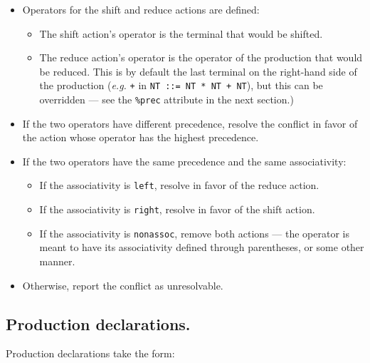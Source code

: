 \documentclass[12pt,english,twoside]{report}
\begin{document}
\begin{itemize}
\item Operators for the shift and reduce actions are defined:

\begin{itemize}
\item The shift action's operator is the terminal that would be shifted.
\item The reduce action's operator is the operator of the production that
would be reduced. This is by default the last terminal on the right-hand
side of the production (\emph{e.g.} \texttt{+} in \texttt{NT ::= NT
{*} NT + NT}), but this can be overridden --- see the \texttt{\%prec}
attribute in the next section.)
\end{itemize}
\item If the two operators have different precedence, resolve the conflict
in favor of the action whose operator has the highest precedence.
\item If the two operators have the same precedence and the same associativity:

\begin{itemize}
\item If the associativity is \texttt{left}, resolve in favor of the reduce
action.
\item If the associativity is \texttt{right}, resolve in favor of the shift
action.
\item If the associativity is \texttt{nonassoc}, remove both actions ---
the operator is meant to have its associativity defined through parentheses,
or some other manner.
\end{itemize}
\item Otherwise, report the conflict as unresolvable.
\end{itemize}

\subsection{\label{sub:Production-declarations.}Production declarations.}

Production declarations take the form:
\end{document}
